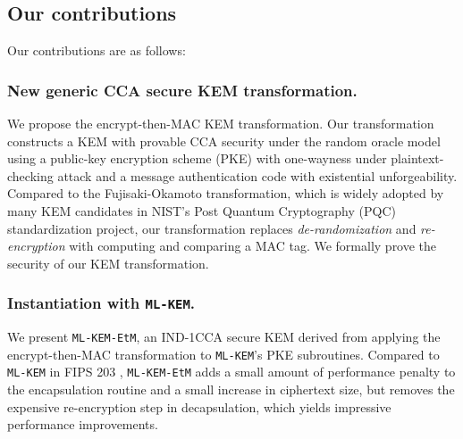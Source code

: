 \documentclass[runningheads]{llncs}
\begin{document}
\subsection{Our contributions}\label{sec:our-contributions}
Our contributions are as follows:

\subsubsection{New generic CCA secure KEM transformation.} We propose the encrypt-then-MAC KEM transformation. Our transformation constructs a KEM with provable CCA security under the random oracle model using a public-key encryption scheme (PKE) with one-wayness under plaintext-checking attack and a message authentication code with existential unforgeability. Compared to the Fujisaki-Okamoto transformation, which is widely adopted by many KEM candidates in NIST's Post Quantum Cryptography (PQC) standardization project, our transformation replaces \textit{de-randomization} and \textit{re-encryption} with computing and comparing a MAC tag. We formally prove the security of our KEM transformation.

\subsubsection{Instantiation with \texttt{ML-KEM}.} We present \texttt{ML-KEM-EtM}, an IND-1CCA secure KEM derived from applying the encrypt-then-MAC transformation to \texttt{ML-KEM}'s PKE subroutines. Compared to \texttt{ML-KEM} in FIPS 203 \cite{FIPS203}, \texttt{ML-KEM-EtM} adds a small amount of performance penalty to the encapsulation routine and a small increase in ciphertext size, but removes the expensive re-encryption step in decapsulation, which yields impressive performance improvements.


\end{document}

